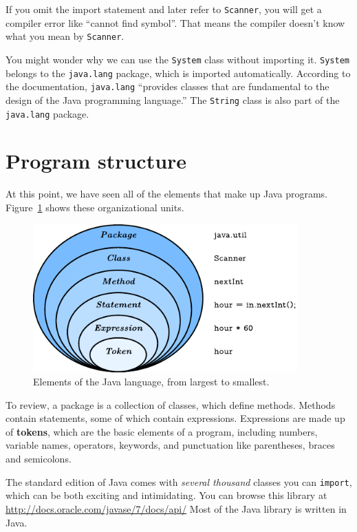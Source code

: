 \documentclass[12pt]{book}
\theoremstyle{exercise}
\newcommand{\java}[1]{\verb"#1"}
\begin{document}
If you omit the import statement and later refer to \java{Scanner}, you will get a compiler error like ``cannot find symbol''.
That means the compiler doesn't know what you mean by \java{Scanner}.

You might wonder why we can use the \java{System} class without importing it.
\java{System} belongs to the \java{java.lang} package, which is imported automatically.
According to the documentation, \java{java.lang} ``provides classes that are fundamental to the design of the Java programming language.''
The \java{String} class is also part of the \java{java.lang} package.


\section{Program structure}
\label{sec:library}

At this point, we have seen all of the elements that make up Java programs.
Figure~\ref{fig.package} shows these organizational units.

\begin{figure}[!ht]
\begin{center}
\includegraphics[width=4in]{figs/package.pdf}
\caption{Elements of the Java language, from largest to smallest.}
\label{fig.package}
\end{center}
\end{figure}

To review, a package is a collection of classes, which define methods.
Methods contain statements, some of which contain expressions.
Expressions are made up of {\bf tokens}, which are the basic elements of a program, including numbers, variable names, operators, keywords, and punctuation like parentheses, braces and semicolons.

The standard edition of Java comes with {\em several thousand} classes you can \java{import}, which can be both exciting and intimidating.
You can browse this library at \url{http://docs.oracle.com/javase/7/docs/api/}
Most of the Java library is written in Java.
\end{document}
